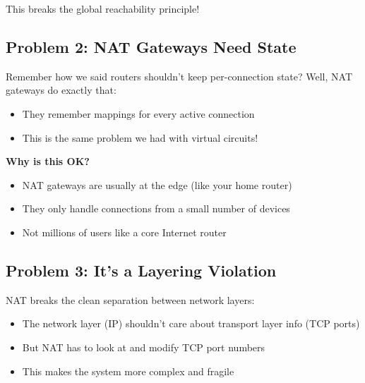 \documentclass[../../compsys.tex]{subfiles}
\begin{document}
This breaks the global reachability principle!

\subsection{Problem 2: NAT Gateways Need State}
Remember how we said routers shouldn't keep per-connection state? Well, NAT gateways do exactly that:
\begin{itemize}
    \item They remember mappings for every active connection
    \item This is the same problem we had with virtual circuits!
\end{itemize}

\textbf{Why is this OK?}
\begin{itemize}
    \item NAT gateways are usually at the edge (like your home router)
    \item They only handle connections from a small number of devices
    \item Not millions of users like a core Internet router
\end{itemize}

\subsection{Problem 3: It's a Layering Violation}
NAT breaks the clean separation between network layers:
\begin{itemize}
    \item The network layer (IP) shouldn't care about transport layer info (TCP ports)
    \item But NAT has to look at and modify TCP port numbers
    \item This makes the system more complex and fragile
\end{itemize}
\end{document}
